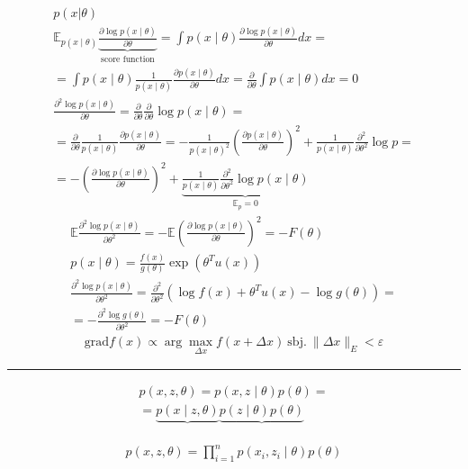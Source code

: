 \documentclass{book}
\begin{document}
\begin{gather*}
   p(x|\theta)\\
   \mathbb{E}_{p(x\mid \theta)} \underbrace{\frac{\partial \log p(x\mid \theta)}{\partial \theta}}_\textrm{score function}=\int {p(x\mid \theta) \frac{\partial \log p(x\mid \theta)}{\partial \theta}dx}=\\
   =\int {p(x\mid \theta)\frac{1}{p(x\mid \theta)}\frac{\partial p(x\mid \theta)}{\partial \theta}dx}=\frac{\partial }{\partial \theta}\int {p(x\mid \theta)dx}=0\\
   \frac{\partial ^2 \log p(x\mid \theta)}{\partial \theta}=\frac{\partial }{\partial \theta}\frac{\partial }{\partial \theta}\log p(x\mid \theta)=\\
   =\frac{\partial }{\partial \theta}\frac{1}{p(x\mid \theta)}\frac{\partial p(x\mid \theta)}{\partial \theta}=
   -\frac{1}{p(x\mid \theta)^2}\left(\frac{\partial p(x\mid \theta)}{\partial \theta}\right)^2+\frac{1}{p(x\mid \theta)}\frac{\partial ^2}{\partial \theta^2}\log p=\\
   =-\left(\frac{\partial \log p(x\mid \theta)}{\partial \theta}\right)^2+\underbrace{\frac{1}{p(x\mid \theta)}\frac{\partial ^2}{\partial \theta^2}\log p(x\mid \theta)}_{\mathbb{E}_p=0}
\end{gather*}
\begin{gather*}
  \mathbb{E}\frac{\partial ^2\log p(x\mid \theta)}{\partial \theta^2}=-\mathbb{E}\left(\frac{\partial \log p(x\mid \theta)}{\partial \theta}\right)^2=-F(\theta)\\
  p(x\mid \theta) = \frac{f(x)}{g(\theta)}\exp (\theta^Tu(x))\\
  \frac{\partial ^2\log p(x\mid \theta)}{\partial \theta^2}=\frac{\partial ^2}{\partial \theta^2}(\log f(x)+\theta^Tu(x)-\log g(\theta))=\\
  =-\frac{\partial ^2\log g(\theta)}{\partial \theta^2}=-F(\theta)
\end{gather*}
\begin{gather*}
    \mathrm{grad}f(x) \propto \arg\max_{\Delta x} f(x+\Delta x)~\mathrm{sbj.}~\|\Delta x\|_E < \varepsilon
\end{gather*}

\hrule

\begin{gather*}
    p(x,z,\theta)=p(x,z\mid \theta)p(\theta)=\\
    =\underbrace{p(x\mid z,\theta)}\underbrace{p(z\mid \theta)p(\theta)}_{}
\end{gather*}

\begin{gather*}
    p(x,z,\theta)=\prod_{i=1}^{n} {p(x_i,z_i\mid \theta)p(\theta)}
\end{gather*}
\end{document}
